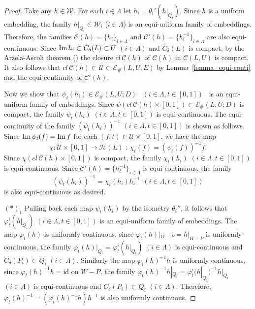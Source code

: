 \documentclass[11pt, fleqn]{amsart}
\theoremstyle{definition}
\newcommand{\cal}{\mathcal}
\renewcommand{\phi}{\varphi}
\newcommand{\lra}{\longrightarrow}
\newcommand{\id}{\mathrm{id}}
\newcommand{\E}{\mathcal E}
\begin{document}
\begin{proof}
Take any $h \in {\cal W}$. For each $i \in \Lambda$ let $h_i = \theta_i'(h|_{Q_i})$. 
Since $h$ is a uniform embedding, 
the family $h|_{Q_i} \in {\cal W}_i$ ($i \in \Lambda$) is an equi-uniform family of embeddings.  
Therefore, the families ${\cal C}(h) = \{ h_i \}_{i \in \Lambda}$ and ${\cal C}'(h) = \{ h_i^{-1} \}_{i \in \Lambda}$ are also equi-continuous. Since ${\rm Im}\,h_i \subset C_{\delta}(L) \subset U$ $(i \in \Lambda)$ and $C_{\delta}(L)$ is compact,  
by the Arzela-Ascoli theorem (\cite[Theorem 6.4]{Du}) the closure $cl\,{\cal C}(h)$ of ${\cal C}(h)$ in ${\cal C}(L, U)$ is compact. 
It also follows that $cl\,{\cal C}(h) \subset {\cal U} \subset \E_\#(L, U; E)$ 
by Lemma~\ref{lemma_equi-conti} and the equi-continuity of ${\cal C}'(h)$.

Now we show that 
$\psi_t(h_i) \in \E_\#(L, U; D)$ \ $(i \in \Lambda, t \in [0,1])$ \ is an equi-uniform family of embeddings.   
Since $\psi(cl\,{\cal C}(h) \times [0,1]) \subset \E_\#(L, U; D)$ is compact, 
the family $\psi_t(h_i)$ $(i \in \Lambda, t \in [0,1])$ is equi-continuous.  
The equi-continuity of the family $(\psi_t(h_i))^{-1}$ $(i \in \Lambda, t \in [0,1])$ is shown as follows.  Since ${\rm Im}\,\psi_t(f) = {\rm Im}\,f$ for each $(f,t) \in {\cal U} \times [0,1]$, 
we have the map  
$$\mbox{$\chi : {\cal U} \times [0,1] \lra {\cal H}(L)$ : $\chi_t(f) = (\psi_t(f))^{-1}f$.}$$ 
Since $\chi(cl\,{\cal C}(h) \times [0,1])$ is compact, 
the family $\chi_t(h_i)$ $(i \in \Lambda, t \in [0,1])$ is equi-continuous. 
Since ${\cal C}'(h) = \{ h_i^{-1} \}_{i \in \Lambda}$ is equi-continuous, 
the family 
$$(\psi_t(h_i))^{-1} = \chi_t(h_i) h_i^{-1} \ \ (i \in \Lambda, t \in [0,1])$$ 
is also equi-continuous as desired. 

$(\ast)_1$ 
Pulling back each map $\psi_t(h_i)$ by the isometry $\theta_i''$, 
it follows that $\phi^i_t(h|_{Q_i})$ $(i \in \Lambda, t \in [0,1])$ is an equi-uniform family of embeddings.
The map $\phi_t(h)$ is uniformly continuous, 
since $\phi_t(h)|_{W-P} = h|_{W-P}$ is uniformly continuous, 
the family $\phi_t(h)|_{Q_i} = \phi^i_t(h|_{Q_i})$ $(i \in \Lambda)$ is equi-continuous 
and $C_\delta(P_i) \subset Q_i$ $(i \in \Lambda)$. 
Similarly the map $\phi_t(h)^{-1}h$ is uniformly continuous, 
since $\phi_t(h)^{-1}h = \id$ on $W-P$, 
the family $\phi_t(h)^{-1}h|_{Q_i} = \phi^i_t(h|_{Q_i})^{-1}h|_{Q_i}$ $(i \in \Lambda)$ is equi-continuous 
and $C_\delta(P_i) \subset Q_i$ $(i \in \Lambda)$. 
Therefore, $\phi_t(h)^{-1} = (\phi_t(h)^{-1}h)h^{-1}$ is also uniformly continuous. 


\end{proof}
\end{document}
